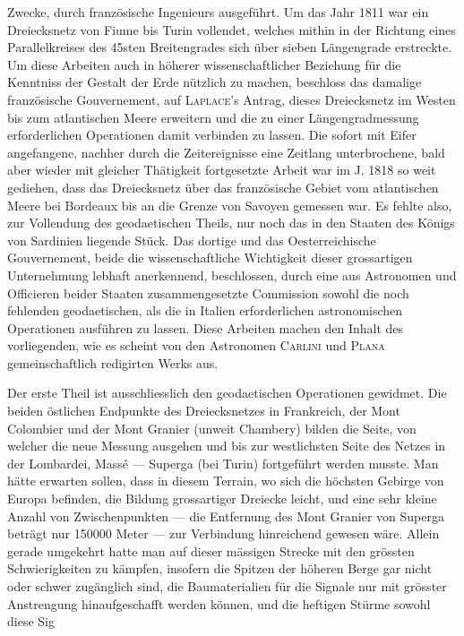 %
Zwecke, durch französische Ingenieurs ausgeführt. Um das Jahr 1811 war ein Dreiecksnetz von Fiume bis Turin vollendet, welches mithin in der Richtung eines Parallelkreises des 45sten Breitengrades sich über sieben Längengrade erstreckte. Um diese Arbeiten auch in höherer wissenschaftlicher Beziehung für die Kenntniss der Gestalt der Erde nützlich zu machen, beschloss das damalige französische Gouvernement, auf \textsc{Laplace}’s Antrag, dieses Dreiecksnetz im Westen bis zum atlantischen Meere erweitern und die zu einer Längengradmessung erforderlichen Operationen damit verbinden zu lassen. Die sofort mit Eifer angefangene, nachher durch die Zeitereignisse eine Zeitlang unterbrochene, bald aber wieder mit gleicher Thätigkeit fortgesetzte Arbeit war im J. 1818 so weit gediehen, dass das Dreiecksnetz über das französische Gebiet vom atlantischen Meere bei Bordeaux bis an die Grenze von Savoyen gemessen war. Es fehlte also, zur Vollendung des geodaetischen Theils, nur noch das in den Staaten des Königs von Sardinien liegende Stück. Das dortige und das Oesterreichische Gouvernement, beide die wissenschaftliche Wichtigkeit dieser grossartigen Unternehmung lebhaft anerkennend, beschlossen, durch eine aus Astronomen und Officieren beider Staaten zusammengesetzte Commission sowohl die noch fehlenden geodaetischen, als die in Italien erforderlichen astronomischen Operationen ausführen zu lassen. Diese Arbeiten machen den Inhalt des vorliegenden, wie es scheint von den Astronomen \textsc{Carlini} und \textsc{Plana} gemeinschaftlich redigirten Werks aus.

Der erste Theil ist ausschliesslich den geodaetischen Operationen gewidmet. Die beiden östlichen Endpunkte des Dreiecksnetzes in Frankreich, der Mont Colombier und der Mont Granier (unweit Chambery) bilden die Seite, von welcher die neue Messung ausgehen und bis zur westlichsten Seite des Netzes in der Lombardei, Massé --- Superga (bei Turin) fortgeführt werden musste. Man hätte erwarten sollen, dass in diesem Terrain, wo sich die höchsten Gebirge von Europa befinden, die Bildung grossartiger Dreiecke leicht, und eine sehr kleine Anzahl von Zwischenpunkten --- die Entfernung des Mont Granier von Superga beträgt nur 150000 Meter --- zur Verbindung hinreichend gewesen wäre. Allein gerade umgekehrt hatte man auf dieser mässigen Strecke mit den grössten Schwierigkeiten zu kämpfen, insofern die Spitzen der höheren Berge gar nicht oder schwer zugänglich sind, die Baumaterialien für die Signale nur mit grösster Anstrengung hinaufgeschafft werden können, und die heftigen Stürme sowohl diese Sig%
